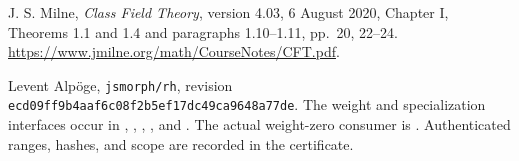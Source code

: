 J. S. Milne, \emph{Class Field Theory}, version 4.03, 6 August 2020,
Chapter I, Theorems 1.1 and 1.4 and paragraphs 1.10--1.11,
pp.~20, 22--24.
\url{https://www.jmilne.org/math/CourseNotes/CFT.pdf}.

Levent Alp\"oge, \texttt{jsmorph/rh},
revision \texttt{ecd09ff9b4aaf6c08f2b5ef17dc49ca9648a77de}.
The weight and specialization interfaces occur in
,
,
,
,
and .
The actual weight-zero consumer is
.
Authenticated ranges, hashes, and scope are recorded in the
 certificate.
